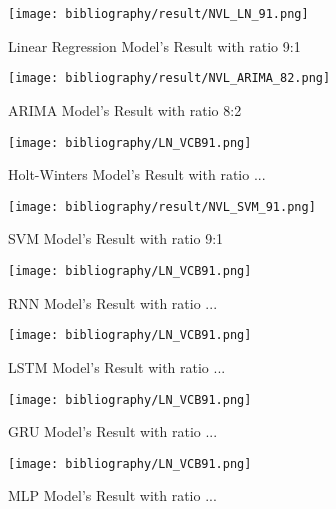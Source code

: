\documentclass{ieeeojies}
\begin{document}
	\begin{figure}[H]
		\centering
		\begin{minipage}{0.9\linewidth}
			\centering
			\texttt{[image: bibliography/result/NVL\_LN\_91.png]}
			\caption{Linear Regression Model's Result with ratio 9:1}
			\label{fig2.1}
		\end{minipage}
	\end{figure}
	\begin{figure}[H]
		\centering
		\begin{minipage}{0.9\linewidth}
			\centering
			\texttt{[image: bibliography/result/NVL\_ARIMA\_82.png]}
			\caption{ARIMA Model's Result with ratio 8:2}
			\label{fig2.2}
		\end{minipage}
	\end{figure}
	\begin{figure}[H]
		\centering
		\begin{minipage}{0.9\linewidth}
			\centering
			\texttt{[image: bibliography/LN\_VCB91.png]}
			\caption{Holt-Winters Model's Result with ratio ...}
			\label{fig2.3}
		\end{minipage}
	\end{figure}
	\begin{figure}[H]
		\centering
		\begin{minipage}{0.9\linewidth}
			\centering
			\texttt{[image: bibliography/result/NVL\_SVM\_91.png]}
			\caption{SVM Model's Result with ratio 9:1}
			\label{fig2.4}
		\end{minipage}
	\end{figure}
	\begin{figure}[H]
		\centering
		\begin{minipage}{0.9\linewidth}
			\centering
			\texttt{[image: bibliography/LN\_VCB91.png]}
			\caption{RNN Model's Result with ratio ...}
			\label{fig2.5}
		\end{minipage}
	\end{figure}
	\begin{figure}[H]
		\centering
		\begin{minipage}{0.9\linewidth}
			\centering
			\texttt{[image: bibliography/LN\_VCB91.png]}
			\caption{LSTM Model's Result with ratio ...}
			\label{fig2.6}
		\end{minipage}
	\end{figure}
	\begin{figure}[H]
		\centering
		\begin{minipage}{0.9\linewidth}
			\centering
			\texttt{[image: bibliography/LN\_VCB91.png]}
			\caption{GRU Model's Result with ratio ...}
			\label{fig2.7}
		\end{minipage}
	\end{figure}
	\begin{figure}[H]
		\centering
		\begin{minipage}{0.9\linewidth}
			\centering
			\texttt{[image: bibliography/LN\_VCB91.png]}
			\caption{MLP Model's Result with ratio ...}
			\label{fig2.8}
		\end{minipage}
	\end{figure}
	
\end{document}
